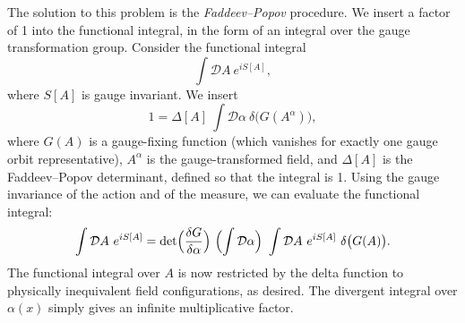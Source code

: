 The solution to this problem is the \emph{Faddeev--Popov} procedure.  We
insert a factor of 1 into the functional integral, in the form of an integral
over the gauge transformation group.  Consider the functional integral
\begin{equation}
  \int \mathcal{D}A\ e^{iS[A]} ,
\end{equation}
where $S[A]$ is gauge invariant.  We insert
\begin{equation}
  1 = \Delta[A]\ \int \mathcal{D}\alpha\ \delta\bigl( G(A^\alpha) \bigr) ,
  \label{eq:9.53}
\end{equation}
where $G(A)$ is a gauge-fixing function (which vanishes for exactly one gauge
orbit representative), $A^\alpha$ is the gauge-transformed field, and
$\Delta[A]$ is the Faddeev--Popov determinant, defined so that the integral is
1.  Using the gauge invariance of the action and of the measure, we can
evaluate the functional integral:
\begin{equation}
  \int \mathcal{D}A\ e^{iS[A]} = \det\Bigl( \frac{\delta G}{\delta\alpha}
    \Bigr)\ \Bigl( \int \mathcal{D}\alpha \Bigr)\
    \int \mathcal{D}A\ e^{iS[A]}\ \delta\bigl( G(A) \bigr) .
  \label{eq:9.54}
\end{equation}
The functional integral over $A$ is now restricted by the delta function to
physically inequivalent field configurations, as desired.  The divergent
integral over $\alpha(x)$ simply gives an infinite multiplicative factor.

